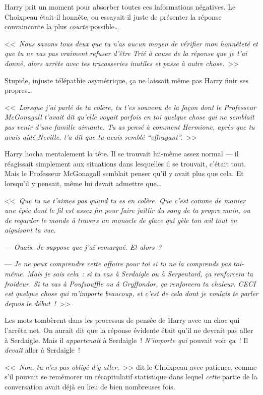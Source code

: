 Harry prit un moment pour absorber toutes ces informations négatives. Le Choixpeau était-il honnête, ou essayait-il juste de présenter la réponse convaincante la plus \emph{courte} possible…

<<~\emph{Nous savons tous deux que tu n'as aucun moyen de vérifier mon honnêteté et que tu ne vas pas vraiment refuser d'être Trié à cause de la réponse que je t'ai donné, alors arrête avec tes tracasseries inutiles et passe à autre chose.}~>>

Stupide, injuste télépathie asymétrique, ça ne laissait même pas Harry finir ses propres…

<<~\emph{Lorsque j'ai parlé de ta colère, tu t'es souvenu de la façon dont le Professeur McGonagall t'avait dit qu'elle voyait parfois en toi quelque chose qui ne semblait pas venir d'une famille aimante. Tu as pensé à comment Hermione, après que tu avais aidé Neville, t'a dit que tu avais semblé “effrayant”.}~>>

Harry hocha mentalement la tête. Il se trouvait lui-même assez normal — il réagissait simplement aux situations dans lesquelles il se trouvait, c'était tout. Mais le Professeur McGonagall semblait penser qu'il y avait plus que cela. Et lorsqu'il y pensait, même lui devait admettre que…

<<~\emph{Que tu ne t'aimes pas quand tu es en colère. Que c'est comme de manier une épée dont le fil est assez fin pour faire jaillir du sang de ta propre main, ou de regarder le monde à travers un monocle de glace qui gèle ton œil tout en aiguisant ta vue.}

--- \emph{Ouais. Je suppose que j'ai remarqué. Et alors~?}

--- \emph{Je ne peux comprendre cette affaire pour toi si tu ne la comprends pas toi-même. Mais je sais cela~: si tu vas à Serdaigle ou à Serpentard, ça renforcera ta froideur. Si tu vas à Poufsouffle ou à Gryffondor, ça renforcera ta chaleur. CECI est quelque chose qui m'importe beaucoup, et c'est de cela dont je voulais te parler depuis le début~!}~>>

Les mots tombèrent dans les processus de pensée de Harry avec un choc qui l'arrêta net. On aurait dit que la réponse évidente était qu'il ne devrait pas aller à Serdaigle. Mais il \emph{appartenait} à Serdaigle~! \emph{N'importe qui} pouvait voir ça~! Il \emph{devait} aller à Serdaigle~!

<<~\emph{Non, tu n'es pas obligé d'y aller,}~>> dit le Choixpeau avec patience, comme s'il pouvait se remémorer un récapitulatif statistique dans lequel \emph{cette} partie de la conversation avait déjà eu lieu de bien nombreuses fois.

